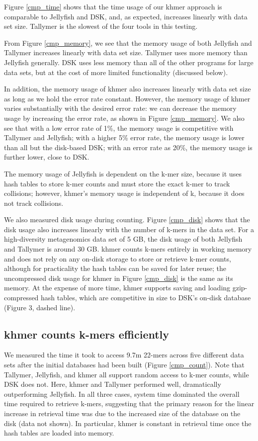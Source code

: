 \documentclass{article}
\begin{document}
Figure \ref{cmp_time} shows that the time usage of our khmer approach
is comparable to Jellyfish and DSK, and, as expected, increases linearly
with data set size. Tallymer is the slowest of the four tools in this testing.

From Figure \ref{cmp_memory}, we see that the memory usage of both
Jellyfish and Tallymer increases linearly with data set size. Tallymer uses more memory than Jellyfish generally.  DSK uses less memory
than all of the other programs for large data sets, but at the cost
of more limited functionality (discussed below).

In addition, the memory usage of khmer also increases linearly with
data set size as long as we hold the error rate constant.  However,
the memory usage of khmer varies substantially with the desired error
rate: we can decrease the memory usage by increasing the
error rate, as shown in Figure \ref{cmp_memory}.  We also
see that with a low error rate of 1\%, the
memory usage is competitive with Tallymer and Jellyfish; with a higher 5\%
error rate, the memory usage is lower than all but the
disk-based DSK; with an error rate as 20\%, the memory usage is further lower,
close to DSK.

The memory usage of Jellyfish is dependent on the k-mer
size, because it uses hash tables to store k-mer counts and must store
the exact k-mer to track collisions; however, khmer's memory
usage is independent of k, because it does not track collisions.

We also measured disk usage during counting.
Figure \ref{cmp_disk} shows that
the disk usage also increases linearly with the number of k-mers in the
data set.
For a high-diversity metagenomics
data set of 5 GB, the disk usage of both Jellyfish and Tallymer is
around 30 GB.  khmer counts k-mers entirely in working memory and does
not rely on any on-disk storage to store or retrieve k-mer counts,
although for practicality the hash tables can be saved for later
reuse; the uncompressed disk usage for khmer in Figure \ref{cmp_disk}
is the same as its memory.  At the expense of more time, khmer
supports saving and loading gzip-compressed hash tables, which are
competitive in size to DSK's on-disk database (Figure 3, dashed line).

\subsection{khmer counts k-mers efficiently}

We measured the time it took to access 9.7m 22-mers across five
different data sets after the initial databases had been built (Figure
\ref{cmp_count}).  Note that Tallymer, Jellyfish, and khmer all
support random access to k-mer counts, while DSK does not. Here,
khmer and Tallymer performed well, dramatically outperforming
Jellyfish.  In all three cases, system time dominated the overall time
required to retrieve k-mers, suggesting that the primary reason for
the linear increase in retrieval time was due to the increased size of
the database on the disk (data not shown).  In particular, khmer is
constant in retrieval time once the hash tables are loaded into
memory.
\end{document}
